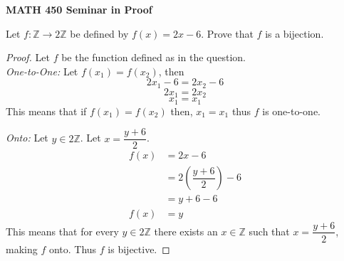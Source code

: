 \documentclass[14pt, fullpage]{article}
\newcommand{\Z}{\mathbb Z}
\begin{document}
\begin{center}
		
{\bf MATH 450 Seminar in Proof}
 \\
\end{center}
	Let $f: \Z \rightarrow 2\Z$ be defined by $f(x) = 2x - 6.$ Prove that $f$ is a bijection.
\begin{proof}
	Let $f$ be the function defined as in the question.\\
	\textit{One-to-One:} Let $f(x_1) = f(x_2)$, then \\
	\begin{equation}
	2x_1 - 6 = 2x_2 - 6
	\end{equation}
	\begin{equation}	
	2x_1 = 2x_2
	\end{equation}
	\begin{equation}
	x_1 = x_1 
	\end{equation}
	This  means that if $f(x_1) = f(x_2)$ then, $x_1 = x_1$ thus $f$ is one-to-one.

	\textit{Onto:} Let $y \in 2\Z$. Let $x = \dfrac{y+6}{2}$. \\
	\begin{equation}			
		\begin{split}
			f(x) &= 2x - 6 \\ 
				 &= 2\left(\dfrac{y+6}{2}\right) - 6\\
				 &= y+6-6\\
			f(x) &= y			
		\end{split}
	\end{equation}
	This  means that for every $y \in 2\Z$ there exists an $x \in \Z$ such that $x = \dfrac{y+6}{2}$, making $f$ onto. Thus $f$ is bijective.
\end{proof}
\end{document}

